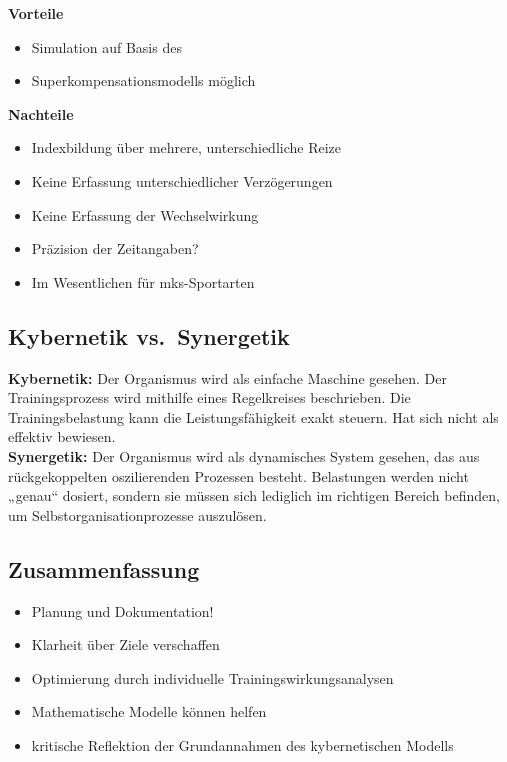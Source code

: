 \textbf{Vorteile}
  \begin{itemize}
    \item Simulation auf Basis des
    \item Superkompensationsmodells möglich
  \end{itemize}
\textbf{Nachteile}
  \begin{itemize}
    \item Indexbildung über mehrere, unterschiedliche Reize
    \item Keine Erfassung unterschiedlicher Verzögerungen
    \item Keine Erfassung der Wechselwirkung
    \item Präzision der Zeitangaben?
    \item Im Wesentlichen für mks-Sportarten
  \end{itemize}

\subsection{Kybernetik vs.\ Synergetik}
\textbf{Kybernetik:} Der Organismus wird als einfache Maschine gesehen.
Der Trainingsprozess wird mithilfe eines Regelkreises beschrieben. 
Die Trainingsbelastung kann die Leistungsfähigkeit exakt steuern.
Hat sich nicht als effektiv bewiesen.\\
\textbf{Synergetik:} Der Organismus wird als dynamisches System gesehen, das aus rückgekoppelten oszilierenden Prozessen besteht.
Belastungen werden nicht „genau“ dosiert, sondern sie müssen sich lediglich im richtigen Bereich befinden, um Selbstorganisationprozesse auszulösen.

\subsection{Zusammenfassung}
\begin{itemize}
  \item Planung und Dokumentation!
  \item Klarheit über Ziele verschaffen
  \item Optimierung durch individuelle Trainingswirkungsanalysen
  \item Mathematische Modelle können helfen
  \item kritische Reflektion der Grundannahmen des kybernetischen Modells
\end{itemize}
